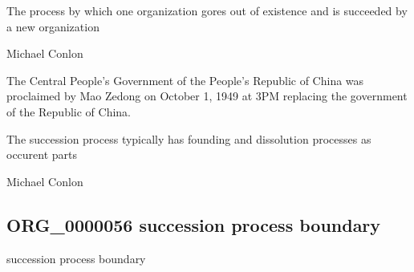 \documentclass[letterpaper,10pt,english]{sphinxmanual}
\begin{document}
\begin{sphinxShadowBox}

\sphinxAtStartPar
{\hyperref[\detokenize{doc-BFO_0000015::doc}]{}}
\end{sphinxShadowBox}

\begin{sphinxShadowBox}

\sphinxAtStartPar
The process by which one organization gores out of existence and is succeeded by a new organization
\end{sphinxShadowBox}

\begin{sphinxShadowBox}

\sphinxAtStartPar
Michael Conlon 
\end{sphinxShadowBox}

\begin{sphinxShadowBox}

\sphinxAtStartPar
The Central People’s Government of the People’s Republic of China was proclaimed by Mao Zedong on October 1, 1949 at 3PM replacing the government of the Republic of China.
\end{sphinxShadowBox}

\begin{sphinxShadowBox}

\sphinxAtStartPar
The succession process typically has founding and dissolution processes as occurent parts
\end{sphinxShadowBox}

\begin{sphinxShadowBox}

\sphinxAtStartPar
Michael Conlon 
\end{sphinxShadowBox}
\begin{quote}

\ignorespaces \end{quote}


\subsection{ORG\_0000056 \sphinxhyphen{} succession process boundary}
\label{\detokenize{doc-ORG_0000056:org-0000056-succession-process-boundary}}\label{\detokenize{doc-ORG_0000056:index-0}}\label{\detokenize{doc-ORG_0000056::doc}}
\begin{sphinxShadowBox}

\sphinxAtStartPar
succession process boundary
\end{sphinxShadowBox}
\end{document}
